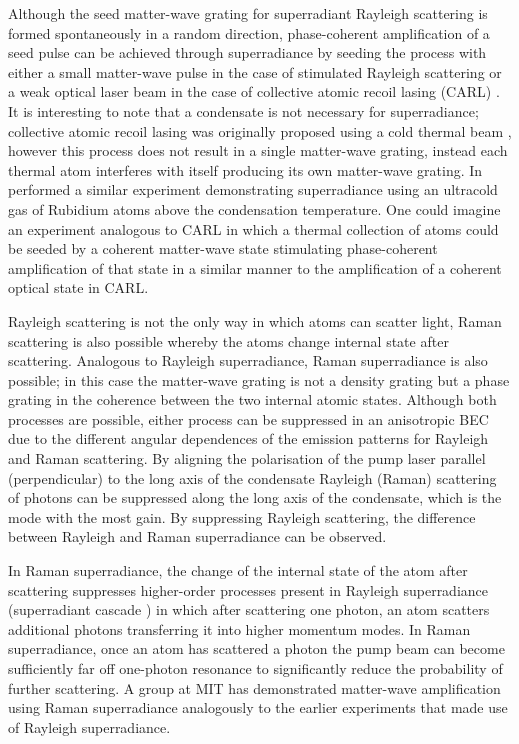 Although the seed matter-wave grating for superradiant Rayleigh scattering is formed spontaneously in a random direction, phase-coherent amplification of a seed pulse can be achieved through superradiance by seeding the process with either a small matter-wave pulse in the case of stimulated Rayleigh scattering \cite{Inouye:1999ph,Kozuma:1999pi} or a weak optical laser beam in the case of collective atomic recoil lasing (CARL) \cite{Bonifacio:1994yq,Bonifacio:1994,Fallani:2005fr}.  It is interesting to note that a condensate is not necessary for superradiance; collective atomic recoil lasing was originally proposed using a cold thermal beam \cite{Bonifacio:1994yq,Bonifacio:1994}, however this process does not result in a single matter-wave grating, instead each thermal atom interferes with itself producing its own matter-wave grating. In \citeyear{Yoshikawa:2005} \citeauthor{Yoshikawa:2005} performed a similar experiment demonstrating superradiance using an ultracold gas of Rubidium atoms above the condensation temperature. One could imagine an experiment analogous to CARL in which a thermal collection of atoms could be seeded by a coherent matter-wave state stimulating phase-coherent amplification of that state in a similar manner to the amplification of a coherent optical state in CARL.

Rayleigh scattering is not the only way in which atoms can scatter light, Raman scattering is also possible whereby the atoms change internal state after scattering. Analogous to Rayleigh superradiance, Raman superradiance \cite{Schneble:2004} is also possible; in this case the matter-wave grating is not a density grating but a phase grating in the coherence between the two internal atomic states. Although both processes are possible, either process can be suppressed in an anisotropic BEC due to the different angular dependences of the emission patterns for Rayleigh and Raman scattering. By aligning the polarisation of the pump laser parallel (perpendicular) to the long axis of the condensate Rayleigh (Raman) scattering of photons can be suppressed along the long axis of the condensate, which is the mode with the most gain. By suppressing Rayleigh scattering, the difference between Rayleigh and Raman superradiance can be observed. 

In Raman superradiance, the change of the internal state of the atom after scattering suppresses higher-order processes present in Rayleigh superradiance (superradiant cascade \cite{Inouye:1999yq}) in which after scattering one photon, an atom scatters additional photons transferring it into higher momentum modes. In Raman superradiance, once an atom has scattered a photon the pump beam can become sufficiently far off one-photon resonance to significantly reduce the probability of further scattering. A group at MIT has demonstrated matter-wave amplification using Raman superradiance \cite{Schneble:2004} analogously to the earlier experiments that made use of Rayleigh superradiance. 

